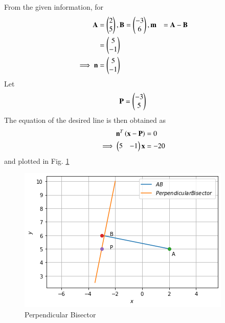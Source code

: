 From the given information, for 
\begin{align}
\Vec{A} &=  \myvec{2 \\ 5 } , \Vec{B} =  \myvec{-3 \\ 6},
\vec{m} &= \vec{A}-\vec{B}
\\
& = \myvec{5 \\ -1}
\\
\implies \vec{n}& = \myvec{5 \\ -1}
\end{align}
Let 
\begin{align}
    \mathbf{P} = \begin{pmatrix}-3\\5\end{pmatrix}
\end{align}
The equation of the desired line is then obtained as
\begin{align}
\label{linform/15/eq:line_norm_vec}
\mathbf{n}^T\left(\mathbf{x}-\mathbf{P}\right) &= 0
\\
\implies \begin{pmatrix}5 & -1\end{pmatrix} \mathbf{x} &= -20
\end{align}
and plotted in Fig. \ref{linform/15/fig: Perpendicular Bisector}	
\begin{figure}[!ht]
\centering
\includegraphics[width=\columnwidth]{solutions/su2021/2/15/download (6).png}
\caption{Perpendicular Bisector}
\label{linform/15/fig: Perpendicular Bisector}	
\end{figure}
